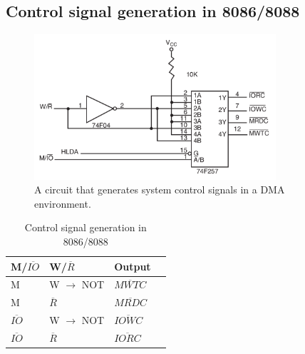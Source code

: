 \subsection{Control signal generation in 8086/8088}
\begin{figure}[h!]
  \includegraphics[width = 0.8\textwidth]{./figures/Control_Signal_Gen.png}
  \caption{A circuit that generates system control signals in a DMA environment.}
\end{figure}

\begin{table}[h!]
\centering
\begin{tabular}{ |p{1cm}|p{1cm}|p{1cm}|p{3cm}|  }
\hline
M/$\overline{IO} $ & W/$ \overline{R} $ & Output   \\
\hline
M               & W $\longrightarrow$ NOT & $\overline{MWTC}$ \\
M               & $\overline{R}$          & $\overline{MRDC}$ \\
$\overline{IO}$ & W $\longrightarrow$ NOT & $\overline{IOWC}$ \\
$\overline{IO}$ & $\overline{R}$          & $\overline{IORC}$ \\
\hline
\end{tabular}
\caption{Control signal generation in 8086/8088}
\label{table:15}
\end{table}

